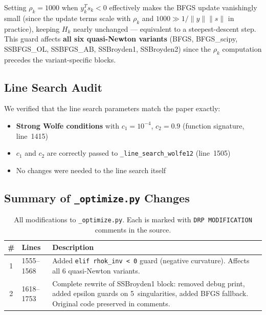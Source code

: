 \documentclass[11pt,a4paper]{article}
\begin{document}
Setting $\rho_k = 1000$ when $y_k^T s_k < 0$ effectively makes the
BFGS update vanishingly small (since the update terms scale with
$\rho_k$ and $1000 \gg 1/\|y\|\|s\|$ in practice), keeping $H_k$
nearly unchanged --- equivalent to a steepest-descent step.  This
guard affects \textbf{all six quasi-Newton variants} (BFGS,
BFGS\_scipy, SSBFGS\_OL, SSBFGS\_AB, SSBroyden1, SSBroyden2) since
the $\rho_k$ computation precedes the variant-specific blocks.

\subsection{Line Search Audit}
\label{sec:line-search}

We verified that the line search parameters match the paper exactly:
\begin{itemize}[nosep]
  \item \textbf{Strong Wolfe conditions} with $c_1 = 10^{-4}$,
        $c_2 = 0.9$ (function signature, line~1415)
  \item $c_1$ and $c_2$ are correctly passed to
        \texttt{\_line\_search\_wolfe12} (line~1505)
  \item No changes were needed to the line search itself
\end{itemize}


\subsection{Summary of \texttt{\_optimize.py} Changes}

\begin{table}[ht]
\centering
\caption{All modifications to \texttt{\_optimize.py}.  Each is marked
  with \texttt{DRP MODIFICATION} comments in the source.}
\label{tab:optimize-changes}
\begin{tabular}{@{}clp{7.5cm}@{}}
\toprule
\textbf{\#} & \textbf{Lines} & \textbf{Description} \\
\midrule
1 & 1555--1568 & Added \texttt{elif rhok\_inv < 0} guard (negative
    curvature).  Affects all 6 quasi-Newton variants. \\
2 & 1618--1753 & Complete rewrite of SSBroyden1 block: removed debug
    print, added epsilon guards on 5~singularities, added BFGS
    fallback.  Original code preserved in comments. \\
\bottomrule
\end{tabular}
\end{table}


\end{document}
